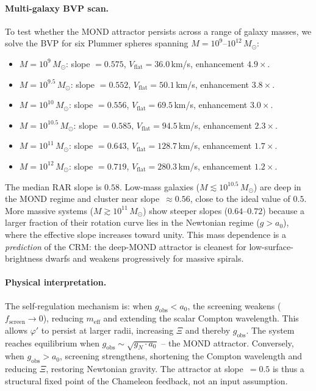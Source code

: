 \documentclass[aps,prd,twocolumn,superscriptaddress,nofootinbib]{revtex4-2}
\begin{document}
\paragraph{Multi-galaxy BVP scan.}
To test whether the MOND attractor persists across a range of galaxy masses, we solve the BVP for six Plummer spheres spanning $M = 10^9$--$10^{12}\,M_\odot$:
\begin{itemize}
\item $M = 10^{9}\,M_\odot$: slope $= 0.575$, $V_{\mathrm{flat}} = 36.0$\,km/s, enhancement $4.9\times$.
\item $M = 10^{9.5}\,M_\odot$: slope $= 0.552$, $V_{\mathrm{flat}} = 50.1$\,km/s, enhancement $3.8\times$.
\item $M = 10^{10}\,M_\odot$: slope $= 0.556$, $V_{\mathrm{flat}} = 69.5$\,km/s, enhancement $3.0\times$.
\item $M = 10^{10.5}\,M_\odot$: slope $= 0.585$, $V_{\mathrm{flat}} = 94.5$\,km/s, enhancement $2.3\times$.
\item $M = 10^{11}\,M_\odot$: slope $= 0.643$, $V_{\mathrm{flat}} = 128.7$\,km/s, enhancement $1.7\times$.
\item $M = 10^{12}\,M_\odot$: slope $= 0.719$, $V_{\mathrm{flat}} = 280.3$\,km/s, enhancement $1.2\times$.
\end{itemize}
The median RAR slope is $0.58$. Low-mass galaxies ($M \lesssim 10^{10.5}\,M_\odot$) are deep in the MOND regime and cluster near slope~$\approx 0.56$, close to the ideal value of $0.5$. More massive systems ($M \gtrsim 10^{11}\,M_\odot$) show steeper slopes ($0.64$--$0.72$) because a larger fraction of their rotation curve lies in the Newtonian regime ($g > a_0$), where the effective slope increases toward unity. This mass dependence is a \textit{prediction} of the CRM: the deep-MOND attractor is cleanest for low-surface-brightness dwarfs and weakens progressively for massive spirals.

\paragraph{Physical interpretation.}
The self-regulation mechanism is: when $g_{\mathrm{obs}} < a_0$, the screening weakens ($f_{\mathrm{screen}} \to 0$), reducing $m_{\mathrm{eff}}$ and extending the scalar Compton wavelength. This allows $\varphi'$ to persist at larger radii, increasing $\Xi$ and thereby $g_{\mathrm{obs}}$. The system reaches equilibrium when $g_{\mathrm{obs}} \sim \sqrt{g_N \cdot a_0}$ -- the MOND attractor. Conversely, when $g_{\mathrm{obs}} > a_0$, screening strengthens, shortening the Compton wavelength and reducing $\Xi$, restoring Newtonian gravity. The attractor at slope~$= 0.5$ is thus a structural fixed point of the Chameleon feedback, not an input assumption.
\end{document}
